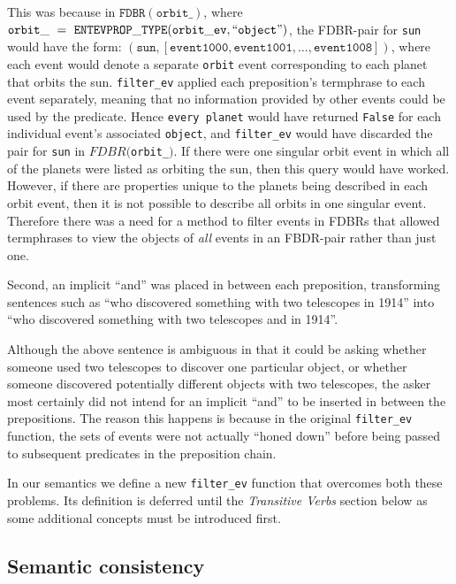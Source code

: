 \documentclass[../main.tex]{subfiles}
\begin{document}
This was because in $\mathtt{FDBR}(\mathtt{orbit\_})$, where $\mathtt{orbit\_}\ =\ \mathtt{ENTEVPROP\_TYPE}(\mathtt{orbit\_ev},\allowbreak \text{``\texttt{object}''})$, the FDBR-pair for \texttt{sun} would have the form: $(\mathtt{sun}, [\mathtt{event1000}, \mathtt{event1001} , \allowbreak \dots , \mathtt{event1008} ])$, where each event would denote a separate \texttt{orbit} event corresponding to each planet that orbits the sun.  \texttt{filter\_ev} applied each preposition's termphrase to each event separately, meaning that no information provided by other events could be used by the predicate.  Hence \texttt{every planet} would have returned \texttt{False} for each individual event's associated \texttt{object}, and \texttt{filter\_ev} would have discarded the pair for \texttt{sun} in $FDBR($\texttt{orbit\_}$)$.  If there were one singular orbit event in which all of the planets were listed as orbiting the sun, then this query would have worked.  However, if there are properties unique to the planets being described in each orbit event, then it is not possible to describe all orbits in one singular event.  Therefore there was a need for a method to filter events in FDBRs that allowed termphrases to view the objects of {\em all} events in an FBDR-pair rather than just one.  

Second, an implicit ``and'' was placed in between each preposition, transforming sentences such as ``who discovered something with two telescopes in 1914'' into ``who discovered something with two telescopes and in 1914''.

Although the above sentence is ambiguous in that it could be asking whether someone used two telescopes to discover one particular object, or whether
someone discovered potentially different objects with two telescopes, the asker most certainly did not intend for an implicit ``and'' to be inserted in between the prepositions.
The reason this happens is because in the original \texttt{filter\_ev} function, the sets of events were not actually ``honed down'' before being passed to subsequent predicates in the preposition chain.

In our semantics we define a new \texttt{filter\_ev} function that overcomes
both these problems.  Its definition is deferred until the {\em Transitive Verbs}
section below as some additional concepts must be introduced first.

\subsection{Semantic consistency}
\end{document}
